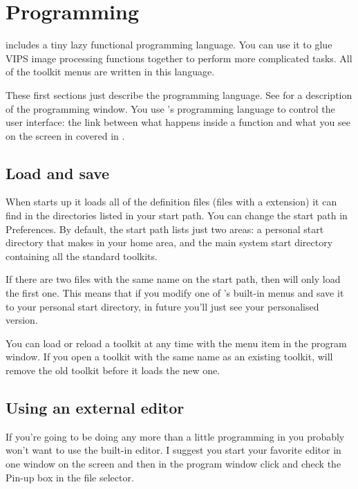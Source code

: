 \chapter{Programming}

\noindent
\nip{} includes a tiny lazy functional programming language. You can use it to
glue VIPS image processing functions together to perform more complicated
tasks.  All of the \nip{} toolkit menus are written in this language.

These first sections just describe the programming language. See
 for a description of the programming window.  You use
\nip{}'s programming language to control the user interface: the link between
what happens inside a \nip{} function and what you see on the screen in
covered in .

\section{Load and save}

When \nip{} starts up it loads all of the definition files (files with a
 extension) it can find in the directories listed in your start
path. You can change the start path in Preferences. By default, the start
path lists just two areas: a personal start directory that \nip{} makes in
your home area, and the main system \nip{} start directory containing all
the standard toolkits.

If there are two files with the same name on the start path, then
\nip{} will only load the first one. This means that if you modify one
of \nip{}'s built-in menus and save it to your personal start directory,
in future you'll just see your personalised version. 

You can load or reload a toolkit at any time with the  menu item in the program window. If you open a toolkit with the same
name as an existing toolkit, \nip{} will remove the old toolkit before it
loads the new one. 

\section{Using an external editor}

If you're going to be doing any more than a little programming in \nip{} you
probably won't want to use the built-in editor. I suggest you start your
favorite editor in one window on the screen and then in the \nip{} program
window click  and check the Pin-up box in the file
selector.

